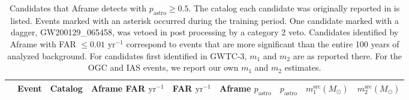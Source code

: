 
\begin{table}[t]
\begin{threeparttable}
\centering
\tiny
\caption[Candidates that Aframe detects with $p_\mathrm{astro} \geq 0.5$ during O3]{Candidates that Aframe detects with $p_\mathrm{astro} \geq 0.5$. The catalog each candidate was originally reported in is listed. Events marked with an asterisk occurred during the training period. One candidate marked with a dagger, GW200129\_065458, was vetoed in post processing by a category 2 veto. Candidates identified by Aframe with FAR $\leq 0.01$ $\mathrm{yr}^{-1}$ correspond to events that are more significant than the entire 100 years of analyzed background. For candidates first identified in GWTC-3, $m_1$ and $m_2$ are as reported there. For the OGC and IAS events, we report our own $m_1$ and $m_2$ estimates.}
\label{o3cat_tab:significant}
\setlength{\tabcolsep}{3pt}
\begin{tabular}{!{\vrule width 1pt}lcccccccc!{\vrule width 1pt}}
\toprule[1pt]
 & Event & Catalog & Aframe FAR $\mathrm{yr}^{-1}$ & FAR $\mathrm{yr}^{-1}$ & Aframe $p_\mathrm{astro}$ & $p_\mathrm{astro}$ & $m_1^\mathrm{src} (M_{\odot})$ & $m_2^\mathrm{src} (M_{\odot})$ \\
\midrule[1pt]


\end{tabular}
\end{threeparttable}
\end{table}
